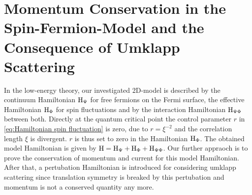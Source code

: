 \section{Momentum Conservation in the Spin-Fermion-Model and the Consequence of Umklapp Scattering}
\label{sec:umklapp scattering}
%
%
In the low-energy theory, our investigated 2D-model is described by the continuum Hamiltonian $\mathrm{H}_{\Psi}$ for free fermions on the Fermi surface, the effective Hamiltonian $\mathrm{H}_{\Phi}$ for spin fluctuations and by the interaction Hamiltonian $\mathrm{H}_{\Psi\Phi}$ between both.
Directly at the quantum critical point the control parameter $r$ in \eqref{eq:Hamiltonian spin fluctuation} is zero, due to $r = \xi^{-2}$ and the correlation length $\xi$ is divergent.
$r$ is thus set to zero in the Hamiltonian $\mathrm{H}_{\Phi}$.
The obtained model Hamiltonian is given by $\mathrm{H} = \mathrm{H}_{\Psi} + \mathrm{H}_{\Phi} + \mathrm{H}_{\Psi\Phi}$.
Our further appraoch is to prove the conservation of momentum and current for this model Hamiltonian.
After that, a pertubation Hamiltonian is introduced for considering umklapp scattering since translation symmetry is breaked by this pertubation and momentum is not a conserved quantity any more.

